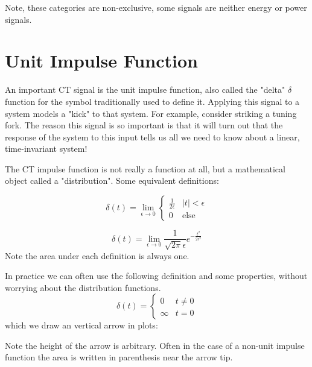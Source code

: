 Note, these categories are non-exclusive, some signals are neither energy or power signals.

\section{Unit Impulse Function}
An important CT signal is the unit impulse function, also called the "delta" $\delta$ function for the symbol traditionally used to define it. Applying this signal to a system models a "kick" to that system. For example, consider striking a tuning fork. The reason this signal is so important is that it will turn out that the response of the system to this input tells us all we need to know about a linear, time-invariant system!

\begin{definition}
The CT impulse function is not really a function at all, but a mathematical object called a "distribution". Some equivalent definitions:

\[
\delta(t) = \lim_{\epsilon \rightarrow 0}\left\{
\begin{array}{ll}
  \frac{1}{2\epsilon} & |t| < \epsilon\\
  0 & \text{else}
\end{array}
\right.
\]

\[
\delta(t) = \lim_{\epsilon \rightarrow 0} \frac{1}{\sqrt{2\pi}\epsilon} e^{-\frac{t^2}{2\epsilon^2}}
\]
Note the area under each definition is always one.
\end{definition}

In practice we can often use the following definition and some properties, without worrying about the distribution functions.
\[
\delta(t) = \left\{
\begin{array}{ll}
  0 & t \neq 0\\
  \infty & t = 0
\end{array}
\right. 
\]
which we draw an vertical arrow in plots:
\begin{center}
\end{center}
Note the height of the arrow is arbitrary. Often in the case of a non-unit impulse function the area is written in parenthesis near the arrow tip.

